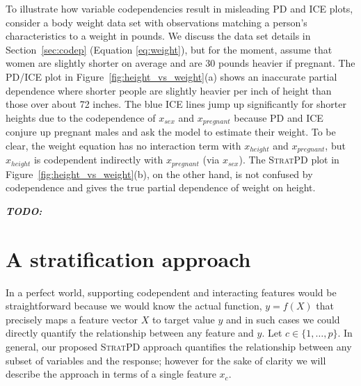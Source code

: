 \documentclass[12pt]{article}
\newcommand{\secref}[1]{Section~\ref{#1}}
\newcommand{\figref}[1]{Figure~\ref{#1}}
\newcommand{\cut}[1]{}
\newcommand{\todo}[1]{{\bf\em TODO:} {{\color{red}{#1}}}}
\newcommand{\spd}{\fontfamily{cmr}\textsc{\small StratPD}}
\begin{document}
To illustrate how variable codependencies result in misleading PD and ICE plots, consider a body weight data set with observations matching a person's characteristics to a weight in pounds. We discuss the data set details in \secref{sec:codep} (Equation \eqref{eq:weight}), but for the moment, assume that women are slightly shorter on average and are 30 pounds heavier if pregnant. The PD/ICE plot in \figref{fig:height_vs_weight}(a) shows an inaccurate partial dependence where shorter people are slightly heavier per inch of height than those over about 72 inches. The blue ICE lines jump up significantly for shorter heights due to the codependence of $x_{sex}$ and $x_{pregnant}$ because PD and ICE conjure up pregnant males and ask the model to estimate their weight.  To be clear, the weight equation has no interaction term with $x_{height}$ and $x_{pregnant}$, but $x_{height}$ is codependent indirectly with $x_{pregnant}$ (via $x_{sex}$).  The \spd{} plot in \figref{fig:height_vs_weight}(b), on the other hand, is not confused by codependence and gives the true partial dependence of weight on height. 

\todo{needs a transition sentence here}

\section{A stratification approach}

In a perfect world, supporting codependent and interacting features would be straightforward because we would know the actual function, $y = f(X)$ that precisely maps a feature vector $X$ to target value $y$ and in such cases we could directly quantify the relationship between any feature and $y$. Let $c \in \{1, \ldots, p\}$. In general, our proposed \spd{} approach quantifies the relationship between any subset of variables and the response; however for the sake of clarity we will describe the approach in terms of a single feature $x_c$.

\cut{The partial derivative of $f(X)$ with respect to a single variable of interest $x_c$ describes how a unit change in $x_c$ affects $y$ for all $x_c$ values, treating all other variables as constants. Integrating the partial derivative $\frac{\partial}{\partial x_{c}} f(X)$ would yield a curve showing just $x_c$'s contribution to $y$. }
\end{document}
